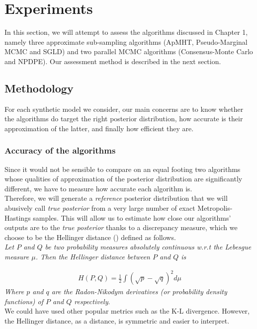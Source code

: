 \documentclass[11pt,a4paper]{report}\usepackage[]{graphicx}\usepackage[]{color}
\begin{document}
\newpage

\chapter{Experiments}
\label{chap:eperiments}

In this section, we will attempt to assess the algorithms discussed in Chapter 1, namely three approximate sub-sampling algorithms (ApMHT, Pseudo-Marginal MCMC and SGLD) and two parallel MCMC algorithms (Consensus-Monte Carlo and NPDPE). Our assessment method is described in the next section.

\section{Methodology}
\label{sec:methodology}
For each synthetic model we consider, our main concerns are to know whether the algorithms do target the right posterior distribution, how accurate is their approximation of the latter, and finally how efficient they are.
\subsection{Accuracy of the algorithms}
Since it would not be sensible to compare on an equal footing two algorithms whose qualities of approximation of the posterior distribution are significantly different, we have to measure how accurate each algorithm is.\\
Therefore, we will generate a \textit{reference} posterior distribution that we will abusively call \textit{true posterior} from a very large number of exact Metropolis-Hastings samples. This will allow us to estimate how close our algorithms' outputs are to the \textit{true posterior} thanks to a discrepancy measure, which we choose to be the Hellinger distance (\cite{hellinger1909neue}) defined as follows.\\

\textit{Let $P$ and $Q$ be two probability measures absolutely continuous w.r.t the Lebesgue measure $\mu$. Then the Hellinger distance between $P$ and $Q$ is}

\begin{align*}
    H(P,Q)=\frac12\int (\sqrt{p}-\sqrt{q})^2d\mu
\end{align*}
\textit{Where $p$ and $q$ are the Radon-Nikodym derivatives (or probability density functions) of $P$ and $Q$ respectively}.\\
We could have used other popular metrics such as the K-L divergence. However, the Hellinger distance, as a distance, is symmetric and easier to interpret.
\end{document}
